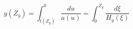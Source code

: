 \begin{equation}\label{yred}
 y(Z_y)=\int_{t(Z_y)}^0\frac{du}{a(u)}=\int_0^{Z_y}\frac{d\xi}{H_y(\xi)}
\end{equation}

